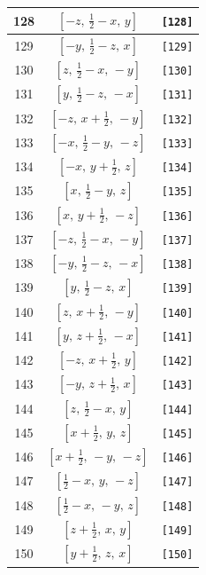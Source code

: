 \documentclass[fleqn,8pt]{jsarticle}
\begin{document}
\begin{longtable}{ccc}
128 & $\left[ - z,\, \frac{1}{2} - x,\, y \right]$ & {\tt [128]} \\ \hline
129 & $\left[ - y,\, \frac{1}{2} - z,\, x \right]$ & {\tt [129]} \\ \hline
130 & $\left[ z,\, \frac{1}{2} - x,\, - y \right]$ & {\tt [130]} \\ \hline
131 & $\left[ y,\, \frac{1}{2} - z,\, - x \right]$ & {\tt [131]} \\ \hline
132 & $\left[ - z,\, x + \frac{1}{2},\, - y \right]$ & {\tt [132]} \\ \hline
133 & $\left[ - x,\, \frac{1}{2} - y,\, - z \right]$ & {\tt [133]} \\ \hline
134 & $\left[ - x,\, y + \frac{1}{2},\, z \right]$ & {\tt [134]} \\ \hline
135 & $\left[ x,\, \frac{1}{2} - y,\, z \right]$ & {\tt [135]} \\ \hline
136 & $\left[ x,\, y + \frac{1}{2},\, - z \right]$ & {\tt [136]} \\ \hline
137 & $\left[ - z,\, \frac{1}{2} - x,\, - y \right]$ & {\tt [137]} \\ \hline
138 & $\left[ - y,\, \frac{1}{2} - z,\, - x \right]$ & {\tt [138]} \\ \hline
139 & $\left[ y,\, \frac{1}{2} - z,\, x \right]$ & {\tt [139]} \\ \hline
140 & $\left[ z,\, x + \frac{1}{2},\, - y \right]$ & {\tt [140]} \\ \hline
141 & $\left[ y,\, z + \frac{1}{2},\, - x \right]$ & {\tt [141]} \\ \hline
142 & $\left[ - z,\, x + \frac{1}{2},\, y \right]$ & {\tt [142]} \\ \hline
143 & $\left[ - y,\, z + \frac{1}{2},\, x \right]$ & {\tt [143]} \\ \hline
144 & $\left[ z,\, \frac{1}{2} - x,\, y \right]$ & {\tt [144]} \\ \hline
145 & $\left[ x + \frac{1}{2},\, y,\, z \right]$ & {\tt [145]} \\ \hline
146 & $\left[ x + \frac{1}{2},\, - y,\, - z \right]$ & {\tt [146]} \\ \hline
147 & $\left[ \frac{1}{2} - x,\, y,\, - z \right]$ & {\tt [147]} \\ \hline
148 & $\left[ \frac{1}{2} - x,\, - y,\, z \right]$ & {\tt [148]} \\ \hline
149 & $\left[ z + \frac{1}{2},\, x,\, y \right]$ & {\tt [149]} \\ \hline
150 & $\left[ y + \frac{1}{2},\, z,\, x \right]$ & {\tt [150]} \\ \hline

\end{longtable}
\end{document}
